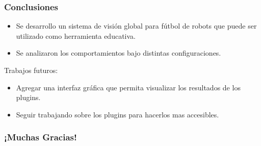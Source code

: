 \documentclass[11pt,a4paper,spanish]{beamer}
\begin{document}
\begin{frame}

\frametitle{Conclusiones}


\begin{itemize}

	\item Se desarrollo un sistema de visión global para fútbol de robots
		que puede ser utilizado como herramienta educativa.

	\item Se analizaron los comportamientos bajo distintas configuraciones.

\end{itemize}

Trabajos futuros:

\begin{itemize}
	
	\item Agregar una interfaz gráfica que permita visualizar los resultados
		de los plugins.

	\item Seguir trabajando sobre los plugins para hacerlos mas accesibles.

\end{itemize}

\end{frame}

\begin{frame}

	\frametitle{¡Muchas Gracias!}

\end{frame}




\end{document}
